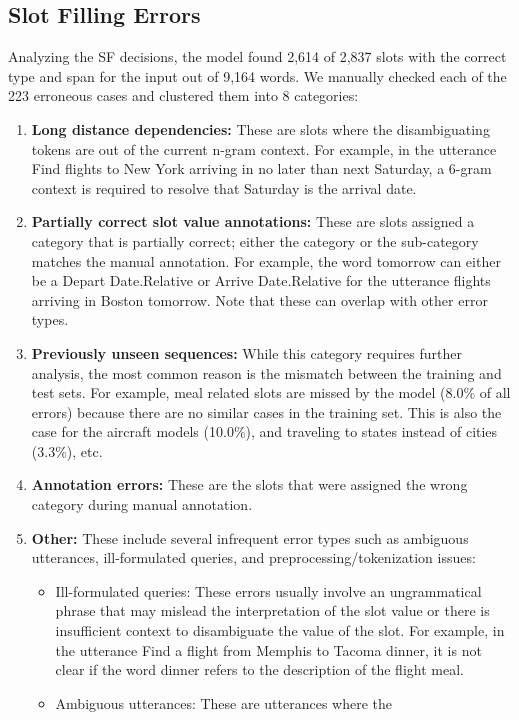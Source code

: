 \subsection{Slot Filling Errors}
Analyzing the SF decisions, the model found 2,614 of 2,837 slots
with the correct type and span for the input out of 9,164 words.
We manually checked each of the 223 erroneous cases and clustered
them into 8 categories:
\begin{enumerate}
\item \textbf{Long distance dependencies:} These are slots where the disambiguating
tokens are out of the current n-gram context. For
example, in the utterance Find flights to New York arriving in
no later than next Saturday, a 6-gram context is required to
resolve that Saturday is the arrival date. 
\item \textbf{Partially correct slot value annotations:} These are slots assigned
a category that is partially correct; either the category
or the sub-category matches the manual annotation. For example,
the word tomorrow can either be a Depart Date.Relative
or Arrive Date.Relative for the utterance flights arriving in
Boston tomorrow. Note that these can overlap with other error
types.
\item \textbf{Previously unseen sequences:} While this category requires
further analysis, the most common reason is the mismatch
between the training and test sets. For example, meal related
slots are missed by the model (8.0\% of all errors) because
there are no similar cases in the training set. This is also the
case for the aircraft models (10.0\%), and traveling to states
instead of cities (3.3\%), etc.
\item \textbf{Annotation errors:} These are the slots that were assigned the
wrong category during manual annotation.
\item \textbf{Other:} These include several infrequent error types such as
ambiguous utterances, ill-formulated queries, and preprocessing/tokenization
issues:
\begin{itemize}
\item Ill-formulated queries: These errors usually involve an
ungrammatical phrase that may mislead the interpretation
of the slot value or there is insufficient context to
disambiguate the value of the slot. For example, in the
utterance Find a flight from Memphis to Tacoma dinner,
it is not clear if the word dinner refers to the description
of the flight meal.
\item Ambiguous utterances: These are utterances where the

\end{itemize}
\end{enumerate}
